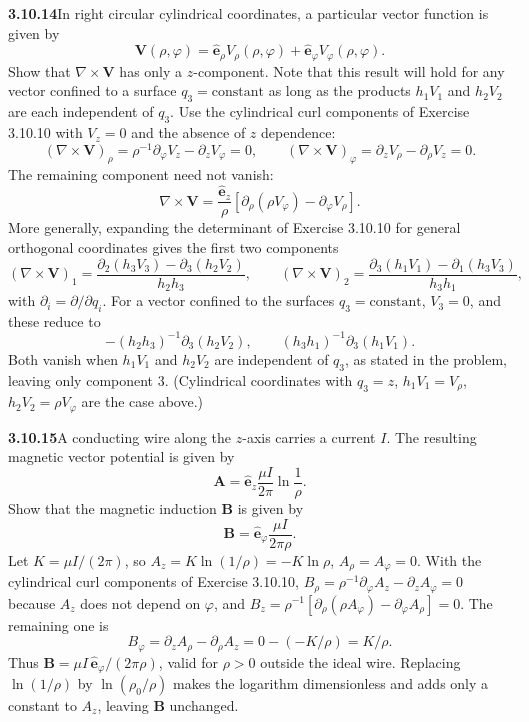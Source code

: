 \par\bigskip
\noindent\textbf{3.10.14}\quad In right circular cylindrical coordinates, a
particular vector function is given by
\[
\mathbf{V}(\rho,\varphi)=\hat{\mathbf{e}}_{\rho}V_{\rho}(\rho,\varphi)
+\hat{\mathbf{e}}_{\varphi}V_{\varphi}(\rho,\varphi).
\]
Show that $\nabla\times\mathbf{V}$ has only a $z$-component. Note that this
result will hold for any vector confined to a surface $q_{3}=\text{constant}$
as long as the products $h_{1}V_{1}$ and $h_{2}V_{2}$ are each independent of
$q_{3}$.
\solution
Use the cylindrical curl components of Exercise 3.10.10 with $V_z=0$
and the absence of $z$ dependence:
\[
(\nabla\times\mathbf V)_\rho=\rho^{-1}\partial_\varphi V_z-\partial_zV_\varphi=0,
\qquad
(\nabla\times\mathbf V)_\varphi=\partial_zV_\rho-\partial_\rho V_z=0.
\]
The remaining component need not vanish:
\[
\boxed{\nabla\times\mathbf V=
\frac{\hat{\mathbf e}_z}{\rho}
[\partial_\rho(\rho V_\varphi)-\partial_\varphi V_\rho]}.
\]
More generally, expanding the determinant of Exercise 3.10.10 for
general orthogonal coordinates gives the first two components
\[
(\nabla\times\mathbf V)_1=\frac{\partial_2(h_3V_3)-\partial_3(h_2V_2)}{h_2h_3},
\qquad
(\nabla\times\mathbf V)_2=\frac{\partial_3(h_1V_1)-\partial_1(h_3V_3)}{h_3h_1},
\]
with $\partial_i=\partial/\partial q_i$. For a vector confined to the
surfaces $q_3=\text{constant}$, $V_3=0$, and these reduce to
\[
-(h_2h_3)^{-1}\partial_3(h_2V_2),\qquad
(h_3h_1)^{-1}\partial_3(h_1V_1).
\]
Both vanish when $h_1V_1$ and $h_2V_2$ are independent of $q_3$, as
stated in the problem, leaving only component 3. (Cylindrical
coordinates with $q_3=z$, $h_1V_1=V_\rho$, $h_2V_2=\rho V_\varphi$ are
the case above.)


\par\bigskip
\noindent\textbf{3.10.15}\quad A conducting wire along the $z$-axis carries a
current $I$. The resulting magnetic vector potential is given by
\[
\mathbf{A}=\hat{\mathbf{e}}_{z}\frac{\mu I}{2\pi}\ln\frac{1}{\rho}.
\]
Show that the magnetic induction $\mathbf{B}$ is given by
\[
\mathbf{B}=\hat{\mathbf{e}}_{\varphi}\frac{\mu I}{2\pi\rho}.
\]
\solution
Let $K=\mu I/(2\pi)$, so $A_z=K\ln(1/\rho)=-K\ln\rho$, $A_\rho=A_\varphi=0$.
With the cylindrical curl components of Exercise 3.10.10,
$B_\rho=\rho^{-1}\partial_\varphi A_z-\partial_zA_\varphi=0$ because
$A_z$ does not depend on $\varphi$, and
$B_z=\rho^{-1}[\partial_\rho(\rho A_\varphi)-\partial_\varphi A_\rho]=0$.
The remaining one is
\[
B_\varphi=\partial_zA_\rho-\partial_\rho A_z
=0-(-K/\rho)=K/\rho.
\]
Thus $\boxed{\mathbf B=\mu I\,\hat{\mathbf e}_\varphi/(2\pi\rho)}$,
valid for $\rho>0$ outside the ideal wire.
Replacing $\ln(1/\rho)$ by $\ln(\rho_0/\rho)$ makes the logarithm
dimensionless and adds only a constant to $A_z$, leaving $\mathbf B$ unchanged.


